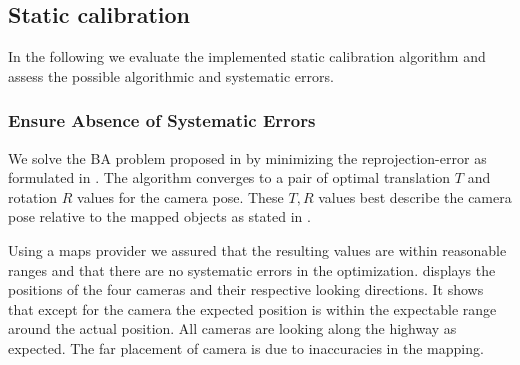 
\subsection{Static calibration}
In the following we evaluate the implemented static calibration algorithm and assess the possible algorithmic and systematic errors.


\subsubsection{Ensure Absence of Systematic Errors}

We solve the BA problem proposed in  by minimizing the reprojection-error as formulated in .
The algorithm converges to a pair of optimal translation $T$ and rotation $R$ values for the camera pose.
These $T, R$ values best describe the camera pose relative to the mapped objects as stated in .

Using a maps provider we assured that the resulting values are within reasonable ranges and that there are no systematic errors in the optimization.
 displays the positions of the four cameras and their respective looking directions. 
It shows that except for the camera  the expected position is within the expectable range around the actual position.
All cameras are looking along the highway as expected. 
The far placement of camera  is due to inaccuracies in the mapping.


